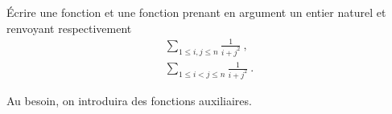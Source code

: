 \question Écrire une fonction  et une fonction  prenant en argument
un entier naturel  et renvoyant respectivement
\begin{gather}
  \sum_{1\leq i,j\leq n} \frac{1}{i+j^{2}}~, \\
  \sum_{1\leq i<j\leq n} \frac{1}{i+j^{2}}~.
\end{gather}

Au besoin, on introduira des fonctions auxiliaires.